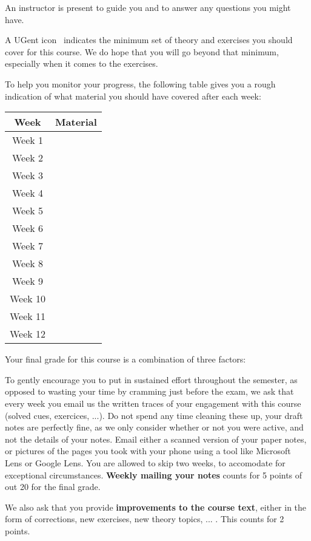 An instructor is present to guide you and to answer any questions you might have.

A UGent icon \iconoffset\ugent\, indicates the minimum set of theory and exercises you should cover for this course. We do hope that you will go beyond that minimum, especially when it comes to the exercises.

To help you monitor your progress, the following table gives you a rough indication of what material you should have covered after each week:

\begin{center}
\begin{tabular}{ |c|c| } 
 \hline
  \textbf{Week} & \textbf{Material} \\
  \hline
 Week 1 &  \\ 
 Week 2 &  \\
 Week 3 &  \\
 Week 4 &  \\
 Week 5 &  \\
 Week 6 &  \\ 
 Week 7 &  \\
 Week 8 &  \\
 Week 9 &  \\
 Week 10 &  \\
 Week 11 &  \\ 
 Week 12 &  \\
 \hline
\end{tabular}
\end{center}

Your final grade for this course is a combination of three factors:

To gently encourage you to put in sustained effort throughout the semester, as opposed to wasting your time by cramming just before the exam, we ask that every week you email us the written traces of your engagement with this course (solved cues, exercices, ...). Do not spend any time cleaning these up, your draft notes are perfectly fine, as we only consider whether or not you were active, and not the details of your notes. Email either a scanned version of your paper notes, or pictures of the pages you took with your phone using a tool like Microsoft Lens or Google Lens. You are allowed to skip two weeks, to accomodate for exceptional circumstances. \textbf{Weekly mailing your notes} counts for 5 points of out 20 for the final grade.

We also ask that you provide \textbf{improvements to the course text}, either in the form of corrections, new exercises, new theory topics, ... . This counts for 2 points.

